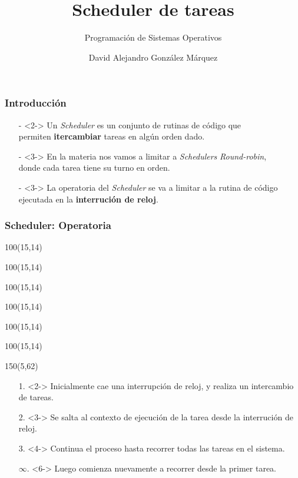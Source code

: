 \documentclass[aspectratio=169]{beamer}
\title{\Huge Scheduler de tareas}
\subtitle{Programación de Sistemas Operativos}
\author{David Alejandro González Márquez}
\institute{Departamento de Computación\\
Facultad de Ciencias Exactas y Naturales\\
Universidad de Buenos Aires}
\date{}
\begin{document}
\frame[plain]{\titlepage}

\begin{frame}
    \frametitle{Introducci\'on}
    \begin{itemize}
    \large 
    \setlength\itemsep{0.5cm}
    \item[-]<2-> Un \emph{Scheduler} es un conjunto de rutinas de código que\\ permiten \textbf{itercambiar} tareas en algún orden dado.
    \item[-]<3-> En la materia nos vamos a limitar a \emph{Schedulers} \emph{Round-robin},\\ donde cada tarea tiene su turno en orden.
    \item[-]<3-> La operatoria del \emph{Scheduler} se va a limitar a la rutina de código\\ ejecutada en la \textbf{interrución de reloj}.
    \end{itemize}
\end{frame}

\begin{frame}[fragile]
    \frametitle{Scheduler: Operatoria}
    \begin{textblock}{100}(15,14)  \end{textblock}
    \begin{textblock}{100}(15,14)  \end{textblock}
    \begin{textblock}{100}(15,14)  \end{textblock}
    \begin{textblock}{100}(15,14)  \end{textblock}
    \begin{textblock}{100}(15,14)  \end{textblock}
    \begin{textblock}{100}(15,14)  \end{textblock}
    \begin{textblock}{150}(5,62)
    \begin{enumerate}
     \item[1.]<2-> Inicialmente cae una interrupción de reloj, y realiza un intercambio de tareas.
     \item[2.]<3-> Se salta al contexto de ejecución de la tarea desde la interrución de reloj.
     \item[3.]<4-> Continua el proceso hasta recorrer todas las tareas en el sistema.
     \item[$\infty$.]<6-> Luego comienza nuevamente a recorrer desde la primer tarea.
    \end{enumerate}
    \end{textblock}
\end{frame}
\end{document}
